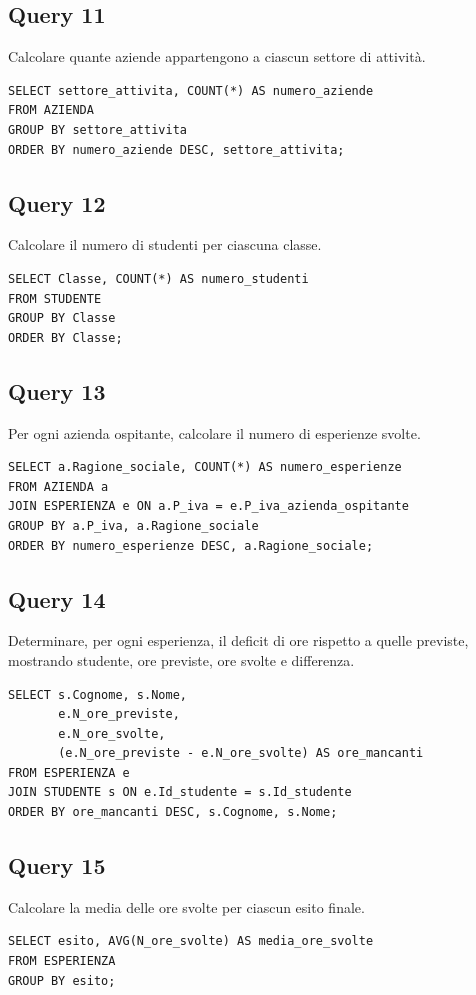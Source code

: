 \documentclass[a4paper,12pt]{article}
\begin{document}
\subsection*{Query 11}Calcolare quante aziende appartengono a ciascun settore di attività.
\begin{lstlisting}
SELECT settore_attivita, COUNT(*) AS numero_aziende
FROM AZIENDA
GROUP BY settore_attivita
ORDER BY numero_aziende DESC, settore_attivita;
\end{lstlisting}
\subsection*{Query 12}Calcolare il numero di studenti per ciascuna classe.
\begin{lstlisting}
SELECT Classe, COUNT(*) AS numero_studenti
FROM STUDENTE
GROUP BY Classe
ORDER BY Classe;
\end{lstlisting}
\subsection*{Query 13}Per ogni azienda ospitante, calcolare il numero di esperienze svolte.
\begin{lstlisting}
SELECT a.Ragione_sociale, COUNT(*) AS numero_esperienze
FROM AZIENDA a
JOIN ESPERIENZA e ON a.P_iva = e.P_iva_azienda_ospitante
GROUP BY a.P_iva, a.Ragione_sociale
ORDER BY numero_esperienze DESC, a.Ragione_sociale;
\end{lstlisting}
\subsection*{Query 14}Determinare, per ogni esperienza, il deficit di ore rispetto a quelle previste, mostrando studente, ore previste, ore svolte e differenza.
\begin{lstlisting}
SELECT s.Cognome, s.Nome,
       e.N_ore_previste,
       e.N_ore_svolte,
       (e.N_ore_previste - e.N_ore_svolte) AS ore_mancanti
FROM ESPERIENZA e
JOIN STUDENTE s ON e.Id_studente = s.Id_studente
ORDER BY ore_mancanti DESC, s.Cognome, s.Nome;
\end{lstlisting}
\subsection*{Query 15}Calcolare la media delle ore svolte per ciascun esito finale.
\begin{lstlisting}
SELECT esito, AVG(N_ore_svolte) AS media_ore_svolte
FROM ESPERIENZA
GROUP BY esito;
\end{lstlisting}
\end{document}

